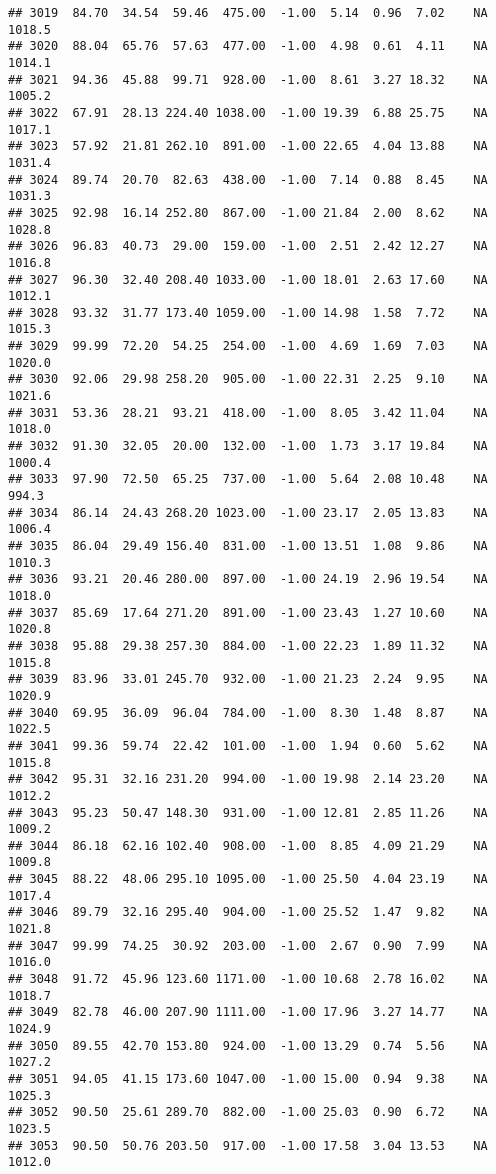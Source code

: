 \documentclass{article}\usepackage{graphicx, color}
\makeatletter
\newenvironment{kframe}{%
 \def\at@end@of@kframe{}%
 \ifinner\ifhmode%
  \def\at@end@of@kframe{\end{minipage}}%
  \begin{minipage}{\columnwidth}%
 \fi\fi%
 \def\FrameCommand##1{\hskip\@totalleftmargin \hskip-\fboxsep
 \colorbox{shadecolor}{##1}\hskip-\fboxsep
     \hskip-\linewidth \hskip-\@totalleftmargin \hskip\columnwidth}%
 \MakeFramed {\advance\hsize-\width
   \@totalleftmargin\z@ \linewidth\hsize
   \@setminipage}}%
 {\par\unskip\endMakeFramed%
 \at@end@of@kframe}
\newenvironment{knitrout}{}{} %
\makeatother
\begin{document}
\begin{knitrout}
\begin{kframe}
\begin{verbatim}
## 3019  84.70  34.54  59.46  475.00  -1.00  5.14  0.96  7.02    NA 1018.5
## 3020  88.04  65.76  57.63  477.00  -1.00  4.98  0.61  4.11    NA 1014.1
## 3021  94.36  45.88  99.71  928.00  -1.00  8.61  3.27 18.32    NA 1005.2
## 3022  67.91  28.13 224.40 1038.00  -1.00 19.39  6.88 25.75    NA 1017.1
## 3023  57.92  21.81 262.10  891.00  -1.00 22.65  4.04 13.88    NA 1031.4
## 3024  89.74  20.70  82.63  438.00  -1.00  7.14  0.88  8.45    NA 1031.3
## 3025  92.98  16.14 252.80  867.00  -1.00 21.84  2.00  8.62    NA 1028.8
## 3026  96.83  40.73  29.00  159.00  -1.00  2.51  2.42 12.27    NA 1016.8
## 3027  96.30  32.40 208.40 1033.00  -1.00 18.01  2.63 17.60    NA 1012.1
## 3028  93.32  31.77 173.40 1059.00  -1.00 14.98  1.58  7.72    NA 1015.3
## 3029  99.99  72.20  54.25  254.00  -1.00  4.69  1.69  7.03    NA 1020.0
## 3030  92.06  29.98 258.20  905.00  -1.00 22.31  2.25  9.10    NA 1021.6
## 3031  53.36  28.21  93.21  418.00  -1.00  8.05  3.42 11.04    NA 1018.0
## 3032  91.30  32.05  20.00  132.00  -1.00  1.73  3.17 19.84    NA 1000.4
## 3033  97.90  72.50  65.25  737.00  -1.00  5.64  2.08 10.48    NA  994.3
## 3034  86.14  24.43 268.20 1023.00  -1.00 23.17  2.05 13.83    NA 1006.4
## 3035  86.04  29.49 156.40  831.00  -1.00 13.51  1.08  9.86    NA 1010.3
## 3036  93.21  20.46 280.00  897.00  -1.00 24.19  2.96 19.54    NA 1018.0
## 3037  85.69  17.64 271.20  891.00  -1.00 23.43  1.27 10.60    NA 1020.8
## 3038  95.88  29.38 257.30  884.00  -1.00 22.23  1.89 11.32    NA 1015.8
## 3039  83.96  33.01 245.70  932.00  -1.00 21.23  2.24  9.95    NA 1020.9
## 3040  69.95  36.09  96.04  784.00  -1.00  8.30  1.48  8.87    NA 1022.5
## 3041  99.36  59.74  22.42  101.00  -1.00  1.94  0.60  5.62    NA 1015.8
## 3042  95.31  32.16 231.20  994.00  -1.00 19.98  2.14 23.20    NA 1012.2
## 3043  95.23  50.47 148.30  931.00  -1.00 12.81  2.85 11.26    NA 1009.2
## 3044  86.18  62.16 102.40  908.00  -1.00  8.85  4.09 21.29    NA 1009.8
## 3045  88.22  48.06 295.10 1095.00  -1.00 25.50  4.04 23.19    NA 1017.4
## 3046  89.79  32.16 295.40  904.00  -1.00 25.52  1.47  9.82    NA 1021.8
## 3047  99.99  74.25  30.92  203.00  -1.00  2.67  0.90  7.99    NA 1016.0
## 3048  91.72  45.96 123.60 1171.00  -1.00 10.68  2.78 16.02    NA 1018.7
## 3049  82.78  46.00 207.90 1111.00  -1.00 17.96  3.27 14.77    NA 1024.9
## 3050  89.55  42.70 153.80  924.00  -1.00 13.29  0.74  5.56    NA 1027.2
## 3051  94.05  41.15 173.60 1047.00  -1.00 15.00  0.94  9.38    NA 1025.3
## 3052  90.50  25.61 289.70  882.00  -1.00 25.03  0.90  6.72    NA 1023.5
## 3053  90.50  50.76 203.50  917.00  -1.00 17.58  3.04 13.53    NA 1012.0

\end{verbatim}
\end{kframe}
\end{knitrout}
\end{document}
